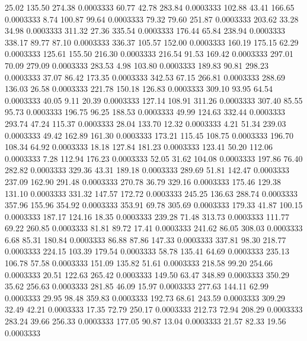   25.02  135.50  274.38   0.0003333
  60.77   42.78  283.84   0.0003333
 102.88   43.41  166.65   0.0003333
   8.74  100.87   99.64   0.0003333
  79.32   79.60  251.87   0.0003333
 203.62   33.28   34.98   0.0003333
 311.32   27.36  335.54   0.0003333
 176.44   65.84  238.94   0.0003333
 338.17   89.77   87.10   0.0003333
 336.37  105.57  152.00   0.0003333
 160.19  175.15   62.29   0.0003333
 125.61  155.50  216.30   0.0003333
 216.54   91.53  169.42   0.0003333
 297.01   70.09  279.09   0.0003333
 283.53    4.98  103.80   0.0003333
 189.83   90.81  298.23   0.0003333
  37.07   86.42  173.35   0.0003333
 342.53   67.15  266.81   0.0003333
 288.69  136.03   26.58   0.0003333
 221.78  150.18  126.83   0.0003333
 309.10   93.95   64.54   0.0003333
  40.05    9.11   20.39   0.0003333
 127.14  108.91  311.26   0.0003333
 307.40   85.55   95.73   0.0003333
 196.75   96.25  188.53   0.0003333
  49.99  124.63  332.44   0.0003333
 293.74   47.24  115.37   0.0003333
  28.04  133.70   12.32   0.0003333
   4.21   51.34  239.03   0.0003333
  49.42  162.89  161.30   0.0003333
 173.21  115.45  108.75   0.0003333
 196.70  108.34   64.92   0.0003333
  18.18  127.84  181.23   0.0003333
 123.41   50.20  112.06   0.0003333
   7.28  112.94  176.23   0.0003333
  52.05   31.62  104.08   0.0003333
 197.86   76.40  282.82   0.0003333
 329.36   43.31  189.18   0.0003333
 289.69   51.81  142.47   0.0003333
 237.09  162.90  291.48   0.0003333
 270.78   36.79  329.16   0.0003333
 175.46  129.38  131.10   0.0003333
 331.32  147.57  172.72   0.0003333
 245.25  136.63  288.74   0.0003333
 357.96  155.96  354.92   0.0003333
 353.91   69.78  305.69   0.0003333
 179.33   41.87  100.15   0.0003333
 187.17  124.16   18.35   0.0003333
 239.28   71.48  313.73   0.0003333
 111.77   69.22  260.85   0.0003333
  81.81   89.72   17.41   0.0003333
 241.62   86.05  308.03   0.0003333
   6.68   85.31  180.84   0.0003333
  86.88   87.86  147.33   0.0003333
 337.81   98.30  218.77   0.0003333
 224.15  103.39  179.54   0.0003333
  58.78  135.41   64.69   0.0003333
 235.13  106.78   57.58   0.0003333
 151.09  135.82   51.61   0.0003333
 218.58   99.20  254.66   0.0003333
  20.51  122.63  265.42   0.0003333
 149.50   63.47  348.89   0.0003333
 350.29   35.62  256.63   0.0003333
 281.85   46.09   15.97   0.0003333
 277.63  144.11   62.99   0.0003333
  29.95   98.48  359.83   0.0003333
 192.73   68.61  243.59   0.0003333
 309.29   32.49   42.21   0.0003333
  17.35   72.79  250.17   0.0003333
 212.73   72.94  208.29   0.0003333
 283.24   39.66  256.33   0.0003333
 177.05   90.87   13.04   0.0003333
  21.57   82.33   19.56   0.0003333
